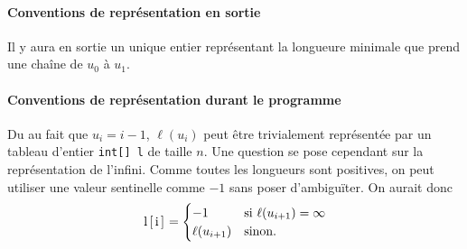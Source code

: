 \paragraph{Conventions de représentation en sortie}
Il y aura en sortie un unique entier représentant la longueure minimale que prend une chaîne de $u_0$ à $u_1$.

\paragraph{Conventions de représentation durant le programme}
Du au fait que $u_i = i-1$, $\ell(u_i)$ peut être trivialement représentée par un tableau d'entier \lstinline|int[] l| de taille $n$.
Une question se pose cependant sur la représentation de l'infini.
Comme toutes les longueurs sont positives, on peut utiliser une valeur sentinelle comme $-1$ sans poser d'ambiguïter.
On aurait donc
$$\lstinline|l[i]| =
\begin{cases}
  -1 & \text{si } \ell(u_{i+1}) = \infty\\
  \ell(u_{i+1}) & \text{sinon}.
\end{cases}$$

